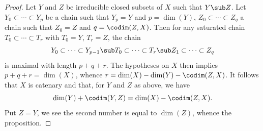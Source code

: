 \begin{proof}
Let $Y$ and $Z$ be irreducible closed subsets of $X$ such that $Y\sub Z$. Let $Y_0\subset\cdots\subset Y_p$ be a chain such that $Y_p=Y$ and $p=\dim(Y)$, $Z_0\subset\cdots\subset Z_q$ a chain such that $Z_0=Z$ and $q=\codim(Z,X)$. Then for any saturated chain $T_0\subset\cdots\subset T_r$ with $T_0=Y$, $T_r=Z$, the chain
\[Y_0\subset\cdots\subset Y_{p-1}\sub T_0\subset\cdots\subset T_r\sub Z_1\subset\cdots\subset Z_q\]
is maximal with length $p+q+r$. The hypotheses on $X$ then implies $p+q+r=\dim(X)$, whence $r=\dim(X)-\dim(Y)-\codim(Z,X)$. It follows that $X$ is catenary and that, for $Y$ and $Z$ as above, we have
\[\dim(Y)+\codim(Y,Z)=\dim(X)-\codim(Z,X).\]
Put $Z=Y$, we see the second number is equal to $\dim(Z)$, whence the proposition.
\end{proof}
